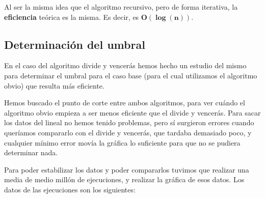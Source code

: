 Al ser la misma idea que el algoritmo recursivo, pero de forma iterativa, la \textbf{eficiencia} teórica es la misma. Es decir, es  $\mathbf{O(\log(n))}$.

\subsection{Determinación del umbral}

En el caso del algoritmo divide y vencerás hemos hecho un estudio del mismo para determinar el umbral para el caso base (para el cual utilizamos el algoritmo obvio) que resulta más eficiente.


Hemos buscado el punto de corte entre ambos algoritmos, para ver cuándo el algoritmo obvio empieza a ser menos eficiente que el divide y vencerás. Para sacar los datos del lineal no hemos tenido problemas, pero sí surgieron errores cuando queríamos compararlo con el divide y vencerás, que tardaba demasiado poco, y cualquier mínimo error movía la gráfica lo suficiente para que no se pudiera determinar nada.

Para poder estabilizar los datos y poder compararlos tuvimos que realizar una media de medio millón de ejecuciones, y realizar la gráfica de esos datos. Los datos de las ejecuciones son los siguientes:

\vspace*{1cm}

\posObvioComp
{}\posDyVComp
{} {\posObvioComp}

\pgfplotstabletypeset[
display columns/0/.style={column name=Tamaño},
display columns/1/.style={column name=Algoritmo Obvio},
display columns/2/.style={column name=Algoritmo DyV (rec)}
]{\posObvioComp}

\vspace*{1cm}

